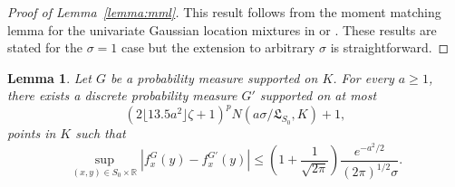 \documentclass[11pt]{article}
\numberwithin{equation}{section}
\newtheorem{lemma}{Lemma}[section]
\newcommand{\RS}{\mathbb{R}}
\newcommand{\lipsz}{\mathfrak{L}}
\begin{document}
\begin{appendices}
\begin{proof}[Proof of Lemma~\ref{lemma:mml}]
  This result follows from the moment matching lemma for the univariate Gaussian location mixtures in  \citet[Lemma 1]{jiang2009general} or \citet[Lemma D.2]{saha2020nonparametric}. These results are stated for the $\sigma = 1$ case but the extension to arbitrary $\sigma$ is straightforward. 
\end{proof}


\begin{lemma}
  Let $G$ be a probability measure supported on $K$. For every $a \geq 1$, there exists a discrete probability measure $G'$ supported on at most
\begin{equation}
 (2\lfloor 13.5 a^2\rfloor \zeta+1)^p N(a \sigma/\lipsz_{S_0}, K)+1,
\label{eq:abdm_ellbound}
\end{equation}
points in $K$ such that 
\begin{equation}
\sup_{(x,y) \in S_0 \times \RS %
} |f^G_x(y) - f^{G'}_x(y)| \leq \left(1+\frac{1}{\sqrt{2\pi}}\right)\frac{e^{-a^2/2}}{ (2\pi)^{1/2} \sigma}.
\label{eq:abdm_result}
\end{equation}
\label{lemma:abdm}
\end{lemma}


\end{appendices}
\end{document}

